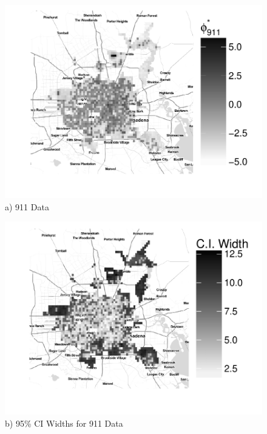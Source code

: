 \documentclass[final]{statsoc}
\begin{document}
\begin{figure}
  \begin{minipage}[t]{0.49\textwidth}
    \centering
    \includegraphics[width=1.0\textwidth]{./imgs/relative_risk_911.pdf}
    \\
    a) 911 Data
    \\
  \end{minipage}
  \hfill
  \begin{minipage}[t]{0.49\textwidth}
    \centering
    \includegraphics[width=1.0\textwidth]{imgs/ci_width_911.pdf}
    \\
    b) 95\% CI Widths for 911 Data
    \\
  \end{minipage}

\end{figure}
\end{document}

